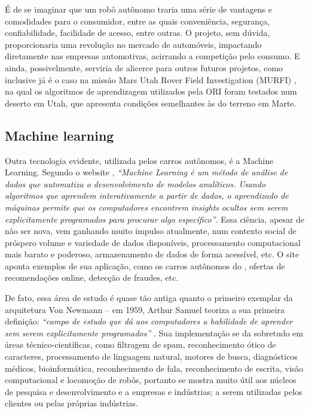 \documentclass[12pt]{article}
\begin{document}
		É de se imaginar que um robô autônomo traria uma série de vantagens e comodidades para o consumidor, entre as quais conveniência, segurança, confiabilidade, facilidade de acesso, entre outras. O projeto, sem dúvida, proporcionaria uma revolução no mercado de automóveis, impactando diretamente nas empresas automotivas, acirrando a competição pelo consumo. E ainda, possivelmente, serviria de alicerce para outros futuros projetos, como inclusive já é o caso na missão Mars Utah Rover Field Investigation (MURFI) \citep{newman_murfi_2017}, na qual os algoritmos de aprendizagem utilizados pela ORI foram testados num deserto em Utah, que apresenta condições semelhantes às do terreno em Marte.
		
		
		
		
		\subsection{Machine learning}
		Outra tecnologia evidente, utilizada pelos carros autônomos, é a Machine Learning. Segundo o website \citet{sas_machine_nodate}, \emph{“Machine Learning é um método de análise de dados que automatiza o desenvolvimento de modelos analíticos. Usando algoritmos que aprendem interativamente a partir de dados, o aprendizado de máquinas permite que os computadores encontrem insights ocultos sem serem explicitamente programados para procurar algo específico”}. Essa ciência, apesar de não ser nova, vem ganhando muito impulso atualmente, num contexto social de próspero volume e variedade de dados disponíveis, processamento computacional mais barato e poderoso, armazenamento de dados de forma acessível, etc. O site aponta exemplos de sua aplicação, como os carros autônomos do \citet{google_-_alphabet_inc._waymo_2009}, ofertas de recomendações online, detecção de fraudes, etc.
		
		De fato, essa área de estudo é quase tão antiga quanto o primeiro exemplar da arquitetura Von Newmann – em 1959, Arthur Samuel teoriza a sua primeira definição: \emph{“campo de estudo que dá aos computadores a habilidade de aprender sem serem explicitamente programados”} \citep{puget_what_2016}. Sua implementação se da sobretudo em áreas técnico-científicas, como filtragem de spam, reconhecimento ótico de caracteres, processamento de linguagem natural, motores de busca, diagnósticos médicos, bioinformática, reconhecimento de fala, reconhecimento de escrita, visão computacional e locomoção de robôs, portanto se mostra muito útil aos núcleos de pesquisa e desenvolvimento e a empresas e indústrias; a serem utilizadas pelos clientes ou pelas próprias indústrias.
		
\end{document}

